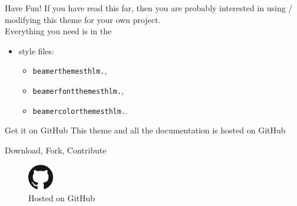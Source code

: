 \documentclass[newPxFont,numfooter,sectionpages]{beamer}
\begin{document}
    
    \begin{frame}[c]{Have Fun!}
    If you have read this far, then you are probably interested in using / modifying this theme for your own project. \\
    \vspace{1em}
    Everything you need is in the
    
    \begin{itemize}
        \item style files:
        \begin{itemize}
            \item \texttt{beamerthemesthlm.},
            \item \texttt{beamerfontthemesthlm.},
            \item \texttt{beamercolorthemesthlm.}.
        \end{itemize}
    \end{itemize}
    
    \end{frame}
    
    
    \begin{frame}[c]{Get it on GitHub}
    This theme and all the documentation is hosted on GitHub \\
    \vspace{1em}
    \begin{center}
    \large{Download, Fork, Contribute}
    
    \vspace{1em}
    
    \begin{figure}
        \centerline{\includegraphics[width=0.1\textwidth]{GitHub-Mark-120px-plus.png}}
    \caption{Hosted on GitHub}
    \end{figure}
    
    \end{center}
    \end{frame}
    
\end{document}
